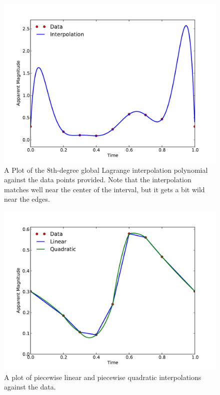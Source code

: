 \documentclass[11pt,letterpaper]{article}
\begin{document}
\begin{figure}[!htb]\centering
  \includegraphics[width=1\textwidth]{Lagrange}
  \caption{A Plot of the 8th-degree global Lagrange interpolation polynomial against the data points provided. Note that the interpolation matches well near the center of the interval, but it gets a bit wild near the edges.}
  \end{figure}

\begin{figure}[!htb]\centering
  \includegraphics[width=1\textwidth]{Piecewise}
  \caption{A plot of piecewise linear and piecewise quadratic interpolations against the data.}
  \end{figure}
\end{document}
